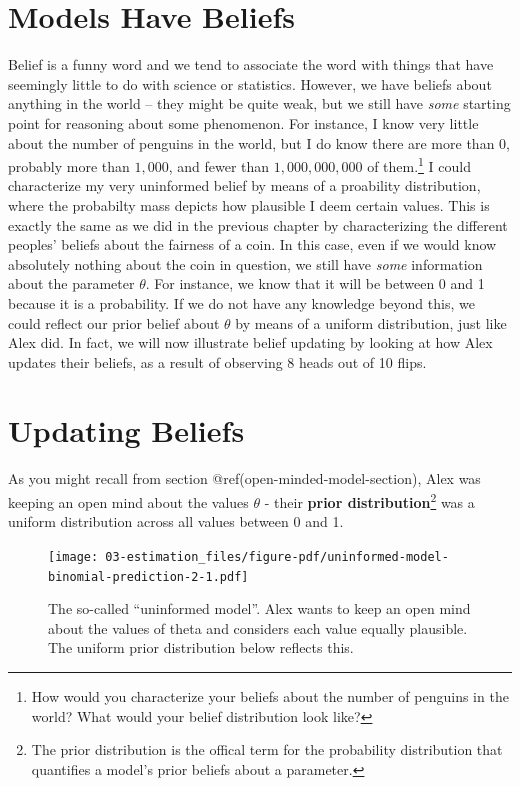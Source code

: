 \documentclass[
  letterpaper,
  DIV=11,
  numbers=noendperiod]{scrreprt}
\begin{document}
\hypertarget{models-have-beliefs}{%
\section{Models Have Beliefs}\label{models-have-beliefs}}

Belief is a funny word and we tend to associate the word with things
that have seemingly little to do with science or statistics. However, we
have beliefs about anything in the world -- they might be quite weak,
but we still have \emph{some} starting point for reasoning about some
phenomenon. For instance, I know very little about the number of
penguins in the world, but I do know there are more than 0, probably
more than \(1{,}000\), and fewer than \(1{,}000{,}000{,}000\) of
them.\footnote{How would you characterize your beliefs about the number
  of penguins in the world? What would your belief distribution look
  like?} I could characterize my very uninformed belief by means of a
proability distribution, where the probabilty mass depicts how plausible
I deem certain values. This is exactly the same as we did in the
previous chapter by characterizing the different peoples' beliefs about
the fairness of a coin. In this case, even if we would know absolutely
nothing about the coin in question, we still have \emph{some}
information about the parameter \(\theta\). For instance, we know that
it will be between 0 and 1 because it is a probability. If we do not
have any knowledge beyond this, we could reflect our prior belief about
\(\theta\) by means of a uniform distribution, just like Alex did. In
fact, we will now illustrate belief updating by looking at how Alex
updates their beliefs, as a result of observing 8 heads out of 10 flips.

\hypertarget{updating-beliefs}{%
\section{Updating Beliefs}\label{updating-beliefs}}

As you might recall from section @ref(open-minded-model-section), Alex
was keeping an open mind about the values \(\theta\) - their
\textbf{prior distribution}\footnote{The prior distribution is the
  offical term for the probability distribution that quantifies a
  model's prior beliefs about a parameter.} was a uniform distribution
across all values between 0 and 1.

\begin{figure}

{\centering \texttt{[image: 03-estimation\_files/figure-pdf/uninformed-model-binomial-prediction-2-1.pdf]}

}

\caption{The so-called ``uninformed model''. Alex wants to keep an open
mind about the values of theta and considers each value equally
plausible. The uniform prior distribution below reflects this.}

\end{figure}
\end{document}
